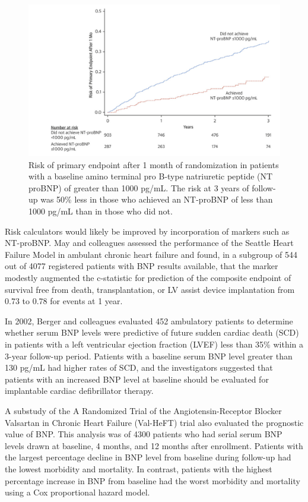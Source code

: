 \documentclass[14pt,a4paper,onecolumn]{extarticle}
\begin{document}
\begin{figure}   \includegraphics{../../images/NTBNP_zile.png}   \caption{Risk of primary endpoint after 1 month of randomization in patients with a baseline amino terminal pro B-type natriuretic peptide (NT proBNP) of greater than 1000 pg/mL. The risk at 3 years of follow-up was 50\% less in those who achieved an NT-proBNP of less than 1000 pg/mL than in those who did not. \citep{Zile2016}}   \label{NTBNP_zile} \end{figure}

Risk calculators would likely be improved by incorporation of markers such as NT-proBNP. May and colleagues assessed the performance of the Seattle Heart Failure Model in ambulant chronic heart failure and found, in a subgroup of 544 out of 4077 registered patients with BNP results available, that the marker modestly augmented the c-statistic for prediction of the composite endpoint of survival free from death, transplantation, or LV assist device implantation from 0.73 to 0.78 for events at 1 year. \citep{May2007}

In 2002, Berger and colleagues  evaluated 452 ambulatory patients to determine whether serum BNP levels were predictive of future sudden cardiac death (SCD) in patients with a left ventricular ejection fraction (LVEF) less than 35\% within a 3-year follow-up period. Patients with a baseline serum BNP level greater than 130 pg/mL had higher rates of SCD, and the investigators suggested that patients with an increased BNP level at baseline should be evaluated for implantable cardiac defibrillator therapy. \citep{Berger2002} %

A substudy of the A Randomized Trial of the Angiotensin-Receptor Blocker Valsartan in Chronic Heart Failure (Val-HeFT) trial also evaluated the prognostic value of BNP. This analysis was of 4300 patients who had serial serum BNP levels drawn at baseline, 4 months, and 12 months after enrollment. Patients with the largest percentage decline in BNP level from baseline during follow-up had the lowest morbidity and mortality. In contrast, patients with the highest percentage increase in BNP from baseline had the worst morbidity and mortality using a Cox proportional hazard model. \citep{Anand2003} %
\end{document}
